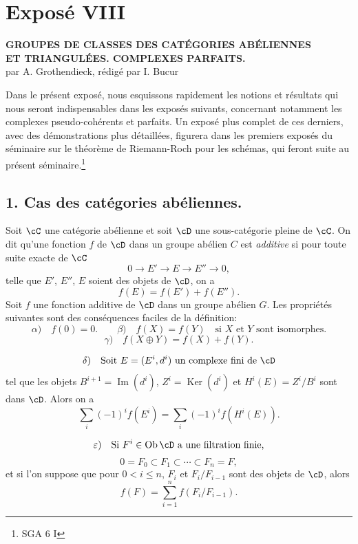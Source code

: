 \newpage
\section*{Exposé VIII}
\renewcommand{\Ob}{\operatorname{Ob}}

\begin{center}
\textbf{GROUPES DE CLASSES DES CATÉGORIES ABÉLIENNES}\\
\textbf{ET TRIANGULÉES. COMPLEXES PARFAITS.}\\[1ex]
par A. Grothendieck, rédigé par I. Bucur
\end{center}

Dans le présent exposé, nous esquissons rapidement les notions et résultats qui nous seront indispensables dans les exposés suivants, concernant notamment les complexes pseudo-cohérents et parfaits. Un exposé plus complet de ces derniers, avec des démonstrations plus détaillées, figurera dans les premiers exposés du séminaire sur le théorème de Riemann-Roch pour les schémas, qui feront suite au présent séminaire.\footnote{SGA 6 I}

\subsection*{1. Cas des catégories abéliennes.}

Soit $\cC$ une catégorie abélienne et soit $\cD$ une sous-catégorie pleine de $\cC$. On dit qu'une fonction $f$ de $\cD$ dans un groupe abélien $C$ est \emph{additive} si pour toute suite exacte de $\cC$
\[
0\longrightarrow E'\longrightarrow E\longrightarrow E''\longrightarrow 0,
\]
telle que $E'$, $E''$, $E$ soient des objets de $\cD$, on a
\[
f(E)=f(E')+f(E'').
\]
Soit $f$ une fonction additive de $\cD$ dans un groupe abélien $G$. Les propriétés suivantes sont des conséquences faciles de la définition:
\[
\alpha)\quad f(0)=0.\qquad
\beta)\quad f(X)=f(Y)\quad\text{si }X\text{ et }Y\text{ sont isomorphes.}
\]
\[
\gamma)\quad f(X\oplus Y)=f(X)+f(Y).
\]

\[
\delta)\quad
\text{Soit }E=(E^i,d^i)\text{ un complexe fini de }\cD
\]
tel que les objets $B^{i+1}=\operatorname{Im}(d^i)$, $Z^i=\operatorname{Ker}(d^i)$ et $H^i(E)=Z^i/B^i$ sont dans $\cD$. Alors on a
\[
\sum_i (-1)^i f(E^i)=\sum_i (-1)^i f(H^i(E)).
\]

\[
\varepsilon)\quad
\text{Si }F^i\in\Ob \cD\text{ a une filtration finie,}
\]
\[
0=F_0\subset F_1\subset\cdots\subset F_n=F,
\]
et si l'on suppose que pour $0<i\le n$, $F_i$ et $F_i/F_{i-1}$ sont des objets de $\cD$, alors
\[
f(F)=\sum_{i=1}^n f(F_i/F_{i-1}).
\]


